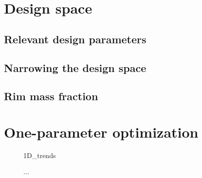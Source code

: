 \documentclass[\rootdir/thesis.tex]{subfiles}
\begin{document}



\section{Design space}

\subsection{Relevant design parameters}

\subsection{Narrowing the design space}

\subsection{Rim mass fraction}


\section{One-parameter optimization}

\begin{figure}
\centering
{1D_trends}
\caption{...}
\label{fig:opt_1D_trends}
\end{figure}

\inprogress
\end{document}
